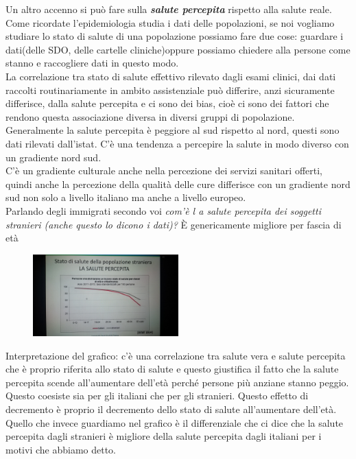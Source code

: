 Un altro accenno si può fare sulla \textbf{\emph{salute percepita}}
rispetto alla salute reale.\\
Come ricordate l'epidemiologia studia i dati delle popolazioni, se noi
vogliamo studiare lo stato di salute di una popolazione possiamo fare
due cose: guardare i dati(delle SDO, delle cartelle cliniche)oppure
possiamo chiedere alla persone come stanno e raccogliere dati in questo
modo.\\
La correlazione tra stato di salute effettivo rilevato dagli esami
clinici, dai dati raccolti routinariamente in ambito assistenziale può
differire, anzi sicuramente differisce, dalla salute percepita e ci sono
dei bias, cioè ci sono dei fattori che rendono questa associazione
diversa in diversi gruppi di popolazione. Generalmente la salute
percepita è peggiore al sud rispetto al nord, questi sono dati rilevati
dall'istat. C'è una tendenza a percepire la salute in modo diverso con
un gradiente nord sud.\\
C'è un gradiente culturale anche nella percezione dei servizi sanitari
offerti, quindi anche la percezione della qualità delle cure differisce
con un gradiente nord sud non solo a livello italiano ma anche a livello
europeo.\\
Parlando degli immigrati secondo voi \emph{com'è l a salute percepita
dei soggetti stranieri (anche questo lo dicono i dati)?} È genericamente
migliore per fascia di età

\begin{figure}[!ht]
\centering
	\includegraphics[width=0.5\textwidth]{27/image2.jpeg}
	\end{figure}

Interpretazione del grafico: c'è una correlazione tra salute vera e
salute percepita che è proprio riferita allo stato di salute e questo
giustifica il fatto che la salute percepita scende all'aumentare
dell'età perché persone più anziane stanno peggio. Questo coesiste sia
per gli italiani che per gli stranieri. Questo effetto di decremento è
proprio il decremento dello stato di salute all'aumentare dell'età.\\
Quello che invece guardiamo nel grafico è il differenziale che ci dice
che la salute percepita dagli stranieri è migliore della salute
percepita dagli italiani per i motivi che abbiamo detto.

